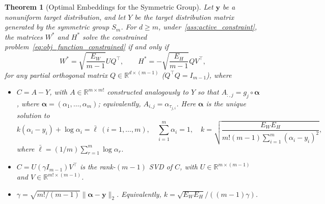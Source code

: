 \documentclass[11pt]{article}
\newtheorem{theorem}{Theorem}
\begin{document}
\begin{theorem}[Optimal Embeddings for the Symmetric Group]
\label{thm:single_block_perm}
Let \(\boldsymbol{y}\) be a nonuniform target distribution, and let \(Y\) be the target distribution matrix generated by the symmetric group \(S_m\).
For \(d\ge m\), under~\cref{ass:active_constraint}, the matrices \(W^*\) and \(H^*\) solve the constrained problem~\cref{eq:obj_function_constrained} if and only if 
\[
  W^*=\sqrt{\frac{E_W}{m-1}} UQ^\top,
  \qquad
  H^*=-\sqrt{\frac{E_H}{m-1}} QV^\top,
\]
for any partial orthogonal matrix \(Q\in\mathbb{R}^{d\times(m-1)}\) (\(Q^\top Q=I_{m-1}\)), where
\begin{itemize}
  \item \(C=A-Y\), with \(A\in\mathbb{R}^{m\times m!}\) constructed analogously to \(Y\) so that \(A_{:,j}=g_j\circ\boldsymbol{\alpha}\), where \(\boldsymbol{\alpha}=(\alpha_1,\ldots,\alpha_m)\); equivalently, \( A_{i,j}=\alpha_{\tau_{j,i}} \).
  Here \(\boldsymbol{\alpha}\) is the unique solution to
  \[
    k(\alpha_i-y_i)+\log\alpha_i=\bar{\ell}\ (i=1,\dots,m),\quad \sum_{i=1}^m\alpha_i=1,\quad
    k=\sqrt{\frac{E_W E_H}{m!(m-1)\sum_{i=1}^m(\alpha_i-y_i)^2}},
  \]
  where \(\bar{\ell}=(1/m)\sum_{r=1}^m \log \alpha_r\).
  \item \(C=U(\gamma I_{m-1}) V^\top\) is the rank-\((m-1)\) SVD of \(C\), with \(U\in\mathbb{R}^{m\times(m-1)}\) and \(V\in\mathbb{R}^{m!\times(m-1)}\).
  \item \(\gamma = \sqrt{m!/(m-1)}\|\boldsymbol{\alpha}-\boldsymbol{y}\|_2\).
  Equivalently, \(k=\sqrt{E_W E_H}/((m-1)\gamma)\).
\end{itemize}
\end{theorem}
\end{document}
